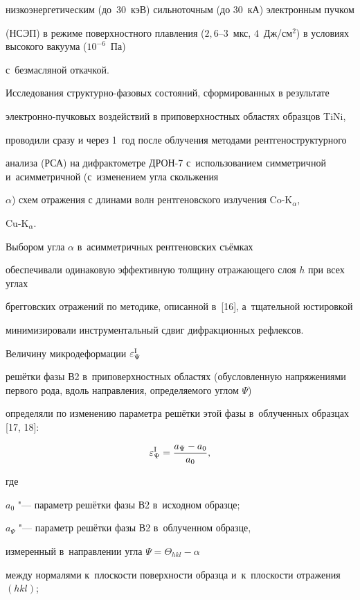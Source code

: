 низкоэнергетическим (до~30~кэВ) сильноточным (до 30~кА) электронным пучком

(НСЭП) в режиме поверхностного плавления ($2,6$--$3$~мкс, $4$~Дж/см$^{2}$) в условиях высокого вакуума ($ 10^{-6}$~Па)

с~безмасляной откачкой.



Исследования структурно-фазовых состояний, сформированных в результате

электронно-пучковых воздействий в приповерхностных областях образцов TiNi,

проводили сразу и через 1~год после облучения методами рентгеноструктурного

анализа (РСА) на дифрактометре ДРОН-7 с~использованием симметричной и~асимметричной (с~изменением угла скольжения

$\alpha $) схем отражения с длинами волн рентгеновского излучения Co-K$_{\alpha }$,

Cu-K$_{\alpha }$.

Выбором угла $\alpha $ в~асимметричных рентгеновских съёмках

обеспечивали одинаковую эффективную толщину отражающего слоя $h$ при всех углах

брегговских отражений по методике, описанной в~[16], а~тщательной юстировкой

минимизировали инструментальный сдвиг дифракционных рефлексов.



Величину микродеформации $\varepsilon _\Psi ^{\rm I}$

решётки фазы В2 в~приповерхностных областях (обусловленную напряжениями первого рода, вдоль направления, определяемого углом $\Psi$)

определяли по изменению параметра решётки этой фазы в~облученных образцах [17, 18]:



\[

\varepsilon _\Psi ^{\rm I} =\frac{a_\Psi -a_0 }{a_0 },

\]

где

$a_0$ "---  параметр решётки фазы В2 в~исходном образце;

$a_\Psi$ "--- параметр решётки фазы В2 в~облученном образце,

измеренный в~направлении угла \linebreak  $\Psi =\Theta_{hkl}-\alpha$

между нормалями к~плоскости поверхности образца и~к~плоскости отражения $(hkl)$;

